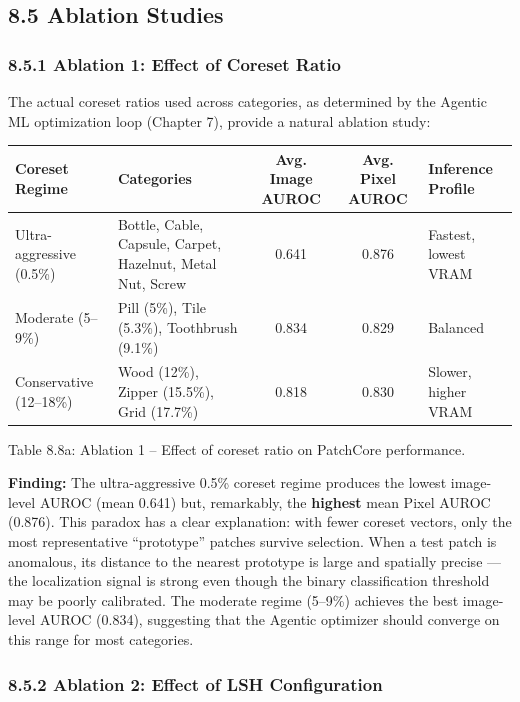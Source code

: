 \documentclass[12pt, a4paper, oneside]{report}
\begin{document}
\bigskip\noindent\hrulefill\bigskip

\subsection{8.5 Ablation Studies}\label{ablation-studies}

\subsubsection{8.5.1 Ablation 1: Effect of Coreset Ratio}\label{ablation-1-effect-of-coreset-ratio}

The actual coreset ratios used across categories, as determined by the Agentic ML optimization loop (Chapter 7), provide a natural ablation study:

{\def\LTcaptype{none} %
\begin{longtable}[]{@{}llccl@{}}
\toprule\noalign{}
Coreset Regime & Categories & Avg. Image AUROC & Avg. Pixel AUROC & Inference Profile \\
\midrule\noalign{}
\endhead
\bottomrule\noalign{}
\endlastfoot
Ultra-aggressive (0.5\%) & Bottle, Cable, Capsule, Carpet, Hazelnut, Metal Nut, Screw & 0.641 & 0.876 & Fastest, lowest VRAM \\
Moderate (5--9\%) & Pill (5\%), Tile (5.3\%), Toothbrush (9.1\%) & 0.834 & 0.829 & Balanced \\
Conservative (12--18\%) & Wood (12\%), Zipper (15.5\%), Grid (17.7\%) & 0.818 & 0.830 & Slower, higher VRAM \\
\end{longtable}
}

Table 8.8a: Ablation 1 -- Effect of coreset ratio on PatchCore performance.

\textbf{Finding:} The ultra-aggressive 0.5\% coreset regime produces the lowest image-level AUROC (mean 0.641) but, remarkably, the \textbf{highest} mean Pixel AUROC (0.876). This paradox has a clear explanation: with fewer coreset vectors, only the most representative ``prototype'' patches survive selection. When a test patch is anomalous, its distance to the nearest prototype is large and spatially precise --- the localization signal is strong even though the binary classification threshold may be poorly calibrated. The moderate regime (5--9\%) achieves the best image-level AUROC (0.834), suggesting that the Agentic optimizer should converge on this range for most categories.

\subsubsection{8.5.2 Ablation 2: Effect of LSH Configuration}\label{ablation-2-effect-of-lsh-configuration}
\end{document}
